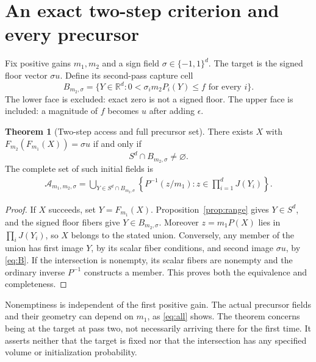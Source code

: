 \documentclass[11pt,a4paper]{article}
\theoremstyle{definition}
\newtheorem{theorem}{Theorem}[section]
\theoremstyle{remark}\newtheorem{remark}[theorem]{Remark}
\newcommand{\R}{\mathbb R}
\numberwithin{equation}{section}
\begin{document}
\section{An exact two-step criterion and every precursor}\label{sec:twostep}
Fix positive gains $m_1,m_2$ and a sign field $\sigma\in\{-1,1\}^d$.
The target is the signed floor vector $\sigma u$.
Define its second-pass capture cell
\begin{equation}\label{eq:B}
 B_{m_2,\sigma}
 =\{Y\in\R^d:0<\sigma_i m_2P_i(Y)\leq f\text{ for every }i\}.
\end{equation}
The lower face is excluded: exact zero is not a signed floor.
The upper face is included: a magnitude of $f$ becomes $u$ after adding
$\epsilon$.

\begin{theorem}[Two-step access and full precursor set]\label{thm:twostep}
There exists $X$ with $F_{m_2}(F_{m_1}(X))=\sigma u$ if and only if
\begin{equation}\label{eq:intersection}
 S^d\cap B_{m_2,\sigma}\ne\varnothing.
\end{equation}
The complete set of such initial fields is
\begin{equation}\label{eq:all}
\begin{split}
 \mathcal A_{m_1,m_2,\sigma}
 =\bigcup_{Y\in S^d\cap B_{m_2,\sigma}}
 \left\{P^{-1}(z/m_1):
             z\in\prod_{i=1}^d J(Y_i)\right\}.
\end{split}
\end{equation}
\end{theorem}
\begin{proof}
If $X$ succeeds, set $Y=F_{m_1}(X)$. Proposition~\ref{prop:range} gives $Y\in S^d$,
and the signed floor fibers give $Y\in B_{m_2,\sigma}$.
Moreover $z=m_1P(X)$ lies in $\prod_iJ(Y_i)$, so $X$ belongs to the stated union.
Conversely, any member of the union has first image $Y$, by its scalar fiber
conditions, and second image $\sigma u$, by \eqref{eq:B}. If the intersection
is nonempty, its scalar fibers are nonempty and the ordinary inverse $P^{-1}$
constructs a member. This proves both the equivalence and completeness.
\end{proof}

Nonemptiness is independent of the first positive gain. The actual precursor
fields and their geometry can depend on $m_1$, as \eqref{eq:all} shows.
The theorem concerns being at the target at pass two, not necessarily arriving
there for the first time. It asserts neither that the target is fixed nor that
the intersection has any specified volume or initialization probability.
\end{document}
